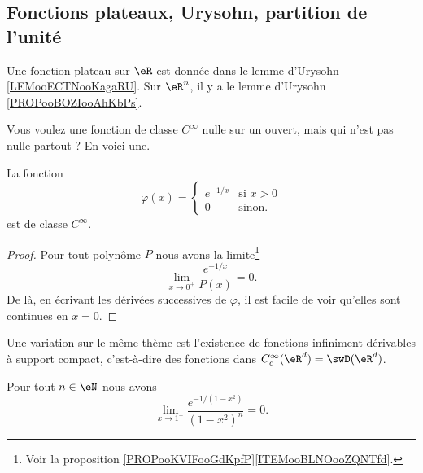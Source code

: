\subsection{Fonctions plateaux, Urysohn, partition de l'unité}
\label{subsecOSYAooXXCVjv}

Une fonction plateau sur \( \eR\) est donnée dans le lemme d'Urysohn \ref{LEMooECTNooKagaRU}. Sur \( \eR^n\), il y a le lemme d'Urysohn \ref{PROPooBOZIooAhKbPs}.


Vous voulez une fonction de classe \( C^{\infty}\) nulle sur un ouvert, mais qui n'est pas nulle partout ? En voici une.
\begin{lemma}       \label{LEMooFLUSooKaZRRY}
	La fonction
	\begin{equation}
		\varphi(x)=\begin{cases}
			e^{-1/x} & \text{si } x>0 \\
			0        & \text{sinon}.
		\end{cases}
	\end{equation}
	est de classe \(  C^{\infty}\).
\end{lemma}

\begin{proof}
	Pour tout polynôme \( P\) nous avons la limite\footnote{Voir la proposition \ref{PROPooKVIFooGdKpfP}\ref{ITEMooBLNOooZQNTfd}.}
	\begin{equation}
		\lim_{x\to 0^+} \frac{ e^{-1/x} }{ P(x)} =0 .
	\end{equation}
	De là, en écrivant les dérivées successives de \( \varphi\), il est facile de voir qu'elles sont continues en \( x=0\).
\end{proof}


Une variation sur le même thème est l'existence de fonctions infiniment dérivables à support compact, c'est-à-dire des fonctions dans \(  C^{\infty}_c(\eR^d)=\swD(\eR^d)\).

\begin{lemma}        \label{LEMooLHIFooWpbauN}
	Pour tout \( n\in \eN\) nous avons
	\begin{equation}
		\lim_{x\to 1^-} \frac{   e^{-1/(1-x^2)}  }{ (1-x^2)^n }=0.
	\end{equation}
\end{lemma}

